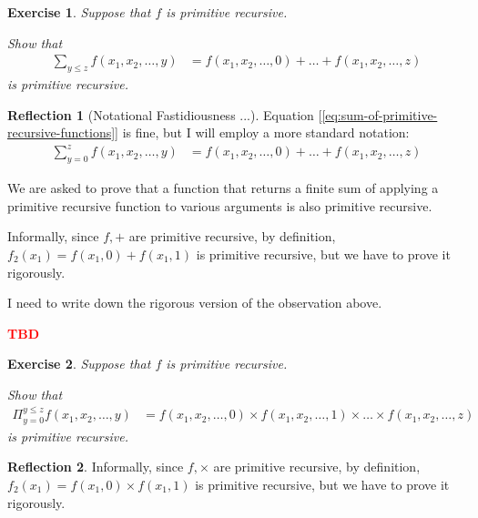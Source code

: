 \documentclass[11pt]{book}
\theoremstyle{definition}
\theoremstyle{plain}
\newtheorem{exercise}{Exercise}[chapter]
\theoremstyle{problemstyle}
\theoremstyle{remark}
\theoremstyle{definition}
\newtheorem{reflection}{Reflection}
\newcommand{\tbd}{
    \vspace{5mm}
    \textbf{\textcolor{red}{\Large{TBD}}}
    \vspace{5mm}
}
\begin{document}
\begin{exercise}
    Suppose that $f$ is primitive recursive.

    Show that 
    \begin{equation}
        \label{eq:sum-of-primitive-recursive-functions}
        \begin{aligned}
            \sum_{y\leq z}f(x_1,x_2,\dots,y)&=f(x_1,x_2,\dots,0)+\dots+f(x_1,x_2,\dots,z)
        \end{aligned}
    \end{equation}
    is primitive recursive.
\end{exercise}
\begin{reflection}[Notational Fastidiousness ...]
    Equation [\ref{eq:sum-of-primitive-recursive-functions}] is fine, but I will employ a more standard notation:
    \begin{equation}
        \label{eq:std-sum-of-primitive-recursive-functions}
        \begin{aligned}
            \sum_{y=0}^{z}f(x_1,x_2,\dots,y)&=f(x_1,x_2,\dots,0)+\dots+f(x_1,x_2,\dots,z)
        \end{aligned}
    \end{equation}

    We are asked to prove that a function that returns a finite sum of applying a primitive recursive function to various arguments is also primitive recursive.

    Informally, since $f, +$ are primitive recursive, by definition, $f_2(x_1)=f(x_1,0)+f(x_1,1)$ is primitive recursive, but we have to prove it rigorously.
\end{reflection}
    I need to write down the rigorous version of the observation above.

    \tbd


\begin{exercise}
    Suppose that $f$ is primitive recursive.

    Show that 
    \begin{equation}
        \label{eq:sum-of-primitive-recursive-functions}
        \begin{aligned}
            \Pi_{y=0}^{y\leq z}f(x_1,x_2,\dots,y)&=f(x_1,x_2,\dots,0)\times f(x_1,x_2,\dots,1)\times\dots\times f(x_1,x_2,\dots,z)
        \end{aligned}
    \end{equation}
    is primitive recursive.
\end{exercise}
    \begin{reflection}
    Informally, since $f, \times$ are primitive recursive, by definition, $f_2(x_1)=f(x_1,0)\times f(x_1,1)$ is primitive recursive, but we have to prove it rigorously.
    \end{reflection}
\end{document}
